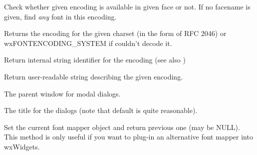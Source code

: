 \label{wxfontmapperisencodingavailable}


Check whether given encoding is available in given face or not.
If no facename is given, find {\it any} font in this encoding.

\label{wxfontmappercharsettoencoding}


Returns the encoding for the given charset (in the form of RFC 2046) or
wxFONTENCODING\_SYSTEM if couldn't decode it.

\label{wxfontmappergetencodingname}


Return internal string identifier for the encoding (see also 
)

\label{wxfontmappergetencodingdescription}


Return user-readable string describing the given encoding.

\label{wxfontmappersetdialogparent}


The parent window for modal dialogs.

\label{wxfontmappersetdialogtitle}


The title for the dialogs (note that default is quite reasonable).

\label{wxfontmapperset}


Set the current font mapper object and return previous one (may be NULL).
This method is only useful if you want to plug-in an alternative font mapper
into wxWidgets.


